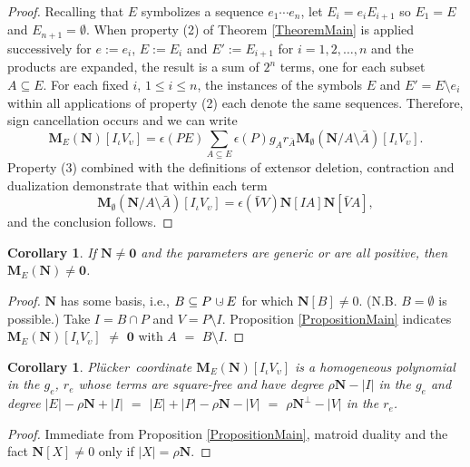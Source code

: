 \documentclass[12pt]{article}
\newtheorem{corollary}[theorem]{Corollary}
\theoremstyle{definition}
\newcommand{\dunion}
{\mbox{\hbox{\hskip6pt$\cdot$\hskip-5.50pt$\cup$\hskip2pt}}}
\newcommand{\Is}{\ensuremath{\iota}}
\newcommand{\Vs}{\ensuremath{\upsilon}}
\newcommand{\Rank}{{\rho}}%
\newcommand{\Card}[1]{\ensuremath{{\left|#1\right|}}}
\newcommand{\ext}[1]{\ensuremath{\mathbf{#1}}}
\newcommand{\Plucker}{Pl\"{u}cker\ }
\begin{document}
\begin{proof}
Recalling that $E$ symbolizes a sequence $e_1\cdots e_n$, 
let $E_{i}=e_iE_{i+1}$ so $E_1=E$ and $E_{n+1}=\emptyset$.
When property (2) of Theorem \ref{TheoremMain}
is applied successively for $e:=e_i$, $E:=E_i$ and
$E':=E_{i+1}$ for $i=1,2,\ldots,n$
and the products are expanded, the result is a sum
of $2^n$ terms, one for each subset $A\subseteq E$.
For each fixed $i$, $1\leq i\leq n$,
the instances of 
the symbols $E$ and $E'=E\setminus e_i$ within 
all applications of property (2) each denote the same sequences.
Therefore, sign cancellation occurs and we can write
\begin{equation}
\label{ExpansionFormula}
\ext{M}_E(\ext{N})[I_{\Is}V_{\Vs}] = \epsilon(PE)
\sum_{A\subseteq E}\epsilon(P)g_Ar_{\bar{A}}
\ext{M}_{\emptyset}(\ext{N}/A\setminus\bar{A})[I_{\Is}V_{\Vs}].
\end{equation}
Property (3) combined with the definitions of extensor deletion,
contraction and dualization demonstrate that within each term
\[
\ext{M}_{\emptyset}(\ext{N}/A\setminus\bar{A})[I_{\Is}V_{\Vs}]
=
\epsilon(\bar{V}V)\ext{N}[IA]\ext{N}[\bar{V}A],
\]
and the conclusion follows.
\end{proof}

\begin{corollary}
\label{MENisNonZero}
If $\ext{N}\neq\ext{0}$ and the parameters are generic or are all
positive, then $\ext{M}_E(\ext{N})\neq\ext{0}$.
\end{corollary}
\begin{proof}
$\ext{N}$ has some basis, i.e., $B\subseteq P\dunion E$ for which $\ext{N}[B]\neq 0$.
(N.B. $B=\emptyset$ is possible.)   Take $I=B\cap P$ and $V=P\setminus I$.
Proposition \ref{PropositionMain} indicates 
$\ext{M}_E(\ext{N})[I_\Is V_\Vs]$ $\neq$ $\ext{0}$ 
with $A$ $=$ $B\setminus I$.
\end{proof}


\begin{corollary}
\label{CorollaryHomoDegree}
\Plucker coordinate $\ext{M}_E(\ext{N})[I_{\Is}V_{\Vs}]$ is a homogeneous
polynomial in the $g_e$, $r_e$ whose terms are square-free and have
degree $\Rank{\ext{N}}-\Card{I}$ in the $g_e$ and degree 
$\Card{E}-\Rank{\ext{N}}+\Card{I}$ $=$ 
$\Card{E}+\Card{P}-\Rank{\ext{N}}-\Card{V}$
$=$ $\Rank{\ext{N}^{\perp}}-\Card{V}$ in the $r_e$.
\end{corollary}

\begin{proof}
Immediate from Proposition
\ref{PropositionMain}, matroid duality and the fact $\ext{N}[X]\neq 0$
only if $\Card{X}=\Rank{\ext{N}}$.
\end{proof}
\end{document}
